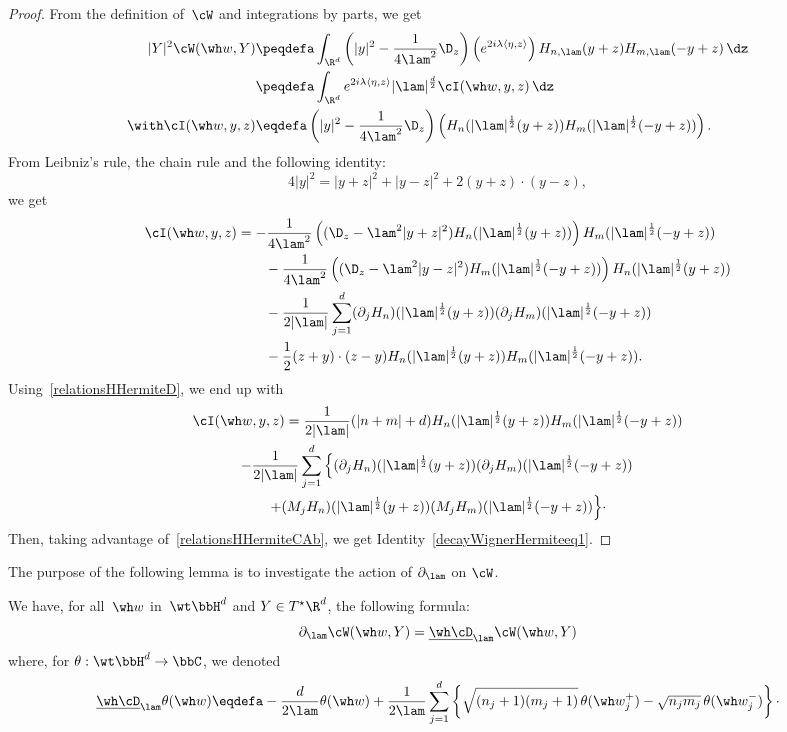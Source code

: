 \begin{proof}
From the definition of~$\cW$ and integrations by parts, we get
\[
\begin{aligned}
|Y|^2\cW(\wh w,Y) & \peqdefa \int_{\R^d} \left(|y|^2-\frac 1 {4\lam^2} \D_z\right) \left(e^{2i\lambda\langle \eta,z\rangle}\right) H_{n,\lam} (y+z) H_{m,\lam} (-y+z)\, \dz \\
&\peqdefa \int_{\R^d} e^{2i\lambda\langle \eta,z\rangle} |\lam|^{\frac d2} \cI(\wh w,y,z) \,\dz \\ \with
\cI(\wh w,y,z) &\eqdefa \left(|y|^2-\frac 1 {4\lam^2} \D_z\right)\left (H_{n} (|\lam|^{\frac 12} (y+z)) H_{m} (|\lam|^{\frac 12} (-y+z))\right).
\end{aligned}
\]
From Leibniz's rule, the chain rule and the following identity:
\[
4|y|^2=|y+z|^2+|y-z|^2+2(y+z)\cdot(y-z),
\]
we get
\begin{align*}
\cI(\wh w,y,z) & = -\frac 1 {4\lam^2} \left((\D_z-\lam^2 |y+z|^2) H_{n} (|\lam|^{\frac 12} (y+z)) \right) H_{m} (|\lam|^{\frac 12} (-y+z)) \\
&\qquad -\frac 1 {4\lam^2} \left((\D_z-\lam^2 |y-z|^2) H_{m} (|\lam|^{\frac 12} (-y+z)) \right) H_{n} (|\lam|^{\frac 12} (y+z)) \\
&\qquad-\frac 1 {2|\lam|}\sum_{j=1}^d(\partial_j H_{n}) (|\lam|^{\frac 12} (y+z)) (\partial_j H_{m}) (|\lam|^{\frac 12} (-y+z))\\
&\qquad-\frac 12 (z+y)\cdot(z-y) H_{n} (|\lam|^{\frac 12} (y+z)) H_{m} (|\lam|^{\frac 12} (-y+z)).
\end{align*}
Using~\eqref{relationsHHermiteD}, we end up with
\begin{multline*}
\cI(\wh w,y,z) = \frac 1{2|\lam|} (|n+m|+d) H_{n} (|\lam|^{\frac 12} (y+z)) H_{m} (|\lam|^{\frac 12} (-y+z))
\\  -\frac 1{2|\lam|} \sum_{j=1}^d \left\{ (\partial_j H_{n}) (|\lam|^{\frac 12} (y+z)) (\partial_j H_{m}) (|\lam|^{\frac 12} (-y+z))\right.\\
\left.  +(M_j H_{n}) (|\lam|^{\frac 12} (y+z)) (M_j H_{m}) (|\lam|^{\frac 12} (-y+z))\right\}\! \cdotp
\end{multline*}
Then, taking advantage of~\eqref{relationsHHermiteCAb}, we get Identity~\eqref{decayWignerHermiteeq1}.
\end{proof}

The purpose of the following lemma is to investigate the action of $\partial_\lam$ on $\cW$.

\begin{lemm}\label{decayWignerHermite}
We have, for all~$\wh w$ in~$\wt\bbH^d$ and $Y\in T^\star\R^d$, the following formula:
\begin{equation}\label{decayWignerHermiteeq2}
\partial_\lam \cW(\wh w,Y) = \underline{\wh\cD}_\lam\cW(\wh w,Y)
\end{equation}
where, for $\theta:\wt\bbH^d\to\bbC$, we denoted
\[
\underline{\wh\cD}_\lam\theta(\wh w)\eqdefa -\frac d{2\lam} \theta(\wh w)+\frac 1 {2\lam} \sum_{j=1} ^d \left\{ \sqrt {(n_j+1) (m_j+1)}\, \theta(\wh w^+_j) - \sqrt {n_jm_j}\, \theta(\wh w^-_j)\right\}\cdotp
\]
\end{lemm}

